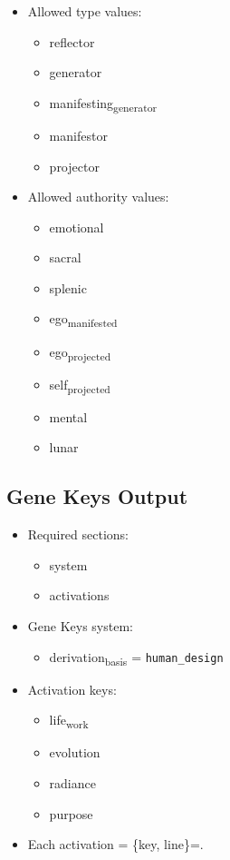 \documentclass[11pt]{article}
\begin{document}
\begin{itemize}
\begin{itemize}
\item quadruple\textsubscript{split}
\end{itemize}
\item Allowed type values:
\begin{itemize}
\item reflector
\item generator
\item manifesting\textsubscript{generator}
\item manifestor
\item projector
\end{itemize}
\item Allowed authority values:
\begin{itemize}
\item emotional
\item sacral
\item splenic
\item ego\textsubscript{manifested}
\item ego\textsubscript{projected}
\item self\textsubscript{projected}
\item mental
\item lunar
\end{itemize}
\end{itemize}
\subsection{Gene Keys Output}
\label{sec:org0381448}
\begin{itemize}
\item Required sections:
\begin{itemize}
\item system
\item activations
\end{itemize}
\item Gene Keys system:
\begin{itemize}
\item derivation\textsubscript{basis} = \texttt{human\_design}
\end{itemize}
\item Activation keys:
\begin{itemize}
\item life\textsubscript{work}
\item evolution
\item radiance
\item purpose
\end{itemize}
\item Each activation = \{key, line\}=.
\end{itemize}
\end{document}
